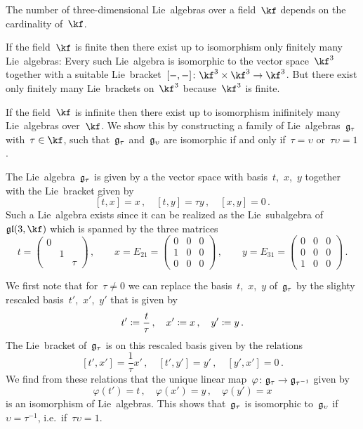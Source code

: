 \begin{example}
  \label{infinitely many three-dimensional lie algebras}
  The number of three-dimensional Lie~algebras over a field~$\kf$ depends on the cardinality of~$\kf$.

  If the field~$\kf$ is finite then there exist up to isomorphism only finitely many {\threedimensional} Lie~algebras:
  Every such Lie~algebra is isomorphic to the vector space~$\kf^3$ together with a suitable Lie~bracket~$[-,-] \colon \kf^3 \times \kf^3 \to \kf^3$.
  But there exist only finitely many Lie~brackets on~$\kf^3$ because~$\kf^3$ is finite.

  If the field~$\kf$ is infinite then there exist up to isomorphism inifinitely many Lie~algebras over~$\kf$.
  We show this by constructing a family of Lie~algebras~$\mathfrak{g}_\tau$ with~$\tau \in \kf$, such that~$\mathfrak{g}_\tau$ and~$\mathfrak{g}_\upsilon$ are isomorphic if and only if~$\tau = \upsilon$ or~$\tau \upsilon = 1$.

  The Lie~algebra~$\mathfrak{g}_\tau$ is given by a the vector space with basis~$t$,~$x$,~$y$ together with the Lie~bracket given by
  \[
    [t, x] = x \,,
    \quad
    [t, y] = \tau y \,,
    \quad
    [x, y] = 0 \,.
  \]
  Such a Lie~algebra exists since it can be realized as the Lie~subalgebra of~$\gllie(3, \kf)$ which is spanned by the three matrices
  \[
    t
    =
    \begin{pmatrix}
      0 &   &       \\
        & 1 &       \\
        &   & \tau
    \end{pmatrix} \,,
    \qquad
    x
    =
    E_{21} 
    =
    \begin{pmatrix}
      0 & 0 & 0 \\
      1 & 0 & 0 \\
      0 & 0 & 0
    \end{pmatrix} \,,
    \qquad
    y
    =
    E_{31}
    =
    \begin{pmatrix}
      0 & 0 & 0 \\
      0 & 0 & 0 \\
      1 & 0 & 0
    \end{pmatrix} \,.
  \]

  We first note that for~$\tau \neq 0$ we can replace the basis~$t$,~$x$,~$y$ of~$\mathfrak{g}_\tau$ by the slighty rescaled basis~$t'$,~$x'$,~$y'$ that is given by
  \[
    t' \coloneqq \frac{t}{\tau} \,,
    \quad
    x' \coloneqq x \,,
    \quad
    y' \coloneqq y \,.
  \]
  The Lie~bracket of~$\mathfrak{g}_\tau$ is on this rescaled basis given by the relations
  \[
    [t', x'] = \frac{1}{\tau} x' \,,
    \quad
    [t', y'] = y' \,,
    \quad
    [y', x'] = 0 \,.
  \]
  We find from these relations that the unique linear map~$\varphi \colon \glie_{\tau} \to \glie_{\tau^{-1}}$ given by
  \[
    \varphi(t') = t \,,
    \quad
    \varphi(x') = y \,,
    \quad
    \varphi(y') = x
  \]
  is an isomorphism of Lie~algebras.
  This shows that~$\mathfrak{g}_{\tau}$ is isomorphic to~$\mathfrak{g}_{\upsilon}$ if~$\upsilon = \tau^{-1}$, i.e.\ if~$\tau \upsilon = 1$.
  

\end{example}
